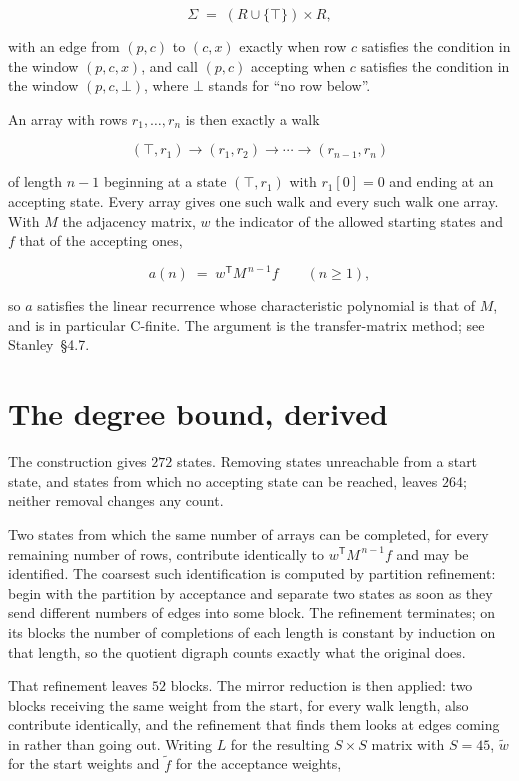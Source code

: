\documentclass[11pt]{article}
\theoremstyle{definition}
\begin{document}
\[\Sigma \;=\; (R \cup \{\top\}) \times R,\]

with an edge from $(p,c)$ to $(c,x)$ exactly when row $c$ satisfies the condition in the window $(p,c,x)$, and call $(p,c)$ accepting when $c$ satisfies the condition in the window $(p,c,\bot)$, where $\bot$ stands for ``no row below''.

An array with rows $r_1,\dots,r_n$ is then exactly a walk

\[(\top,r_1) \to (r_1,r_2) \to \cdots \to (r_{n-1},r_n)\]

of length $n-1$ beginning at a state $(\top,r_1)$ with $r_1[0]=0$ and ending at an accepting state. Every array gives one such walk and every such walk one array. With $M$ the adjacency matrix, $w$ the indicator of the allowed starting states and $f$ that of the accepting ones,

\[a(n) \;=\; w^{\mathsf T} M^{\,n-1} f \qquad (n \ge 1),\]

so $a$ satisfies the linear recurrence whose characteristic polynomial is that of $M$, and is in particular C-finite. The argument is the transfer-matrix method; see Stanley~\S4.7.

\section{The degree bound, derived}

The construction gives $272$ states. Removing states unreachable from a start state, and states from which no accepting state can be reached, leaves $264$; neither removal changes any count.

Two states from which the same number of arrays can be completed, for every remaining number of rows, contribute identically to $w^{\mathsf T}M^{\,n-1}f$ and may be identified. The coarsest such identification is computed by partition refinement: begin with the partition by acceptance and separate two states as soon as they send different numbers of edges into some block. The refinement terminates; on its blocks the number of completions of each length is constant by induction on that length, so the quotient digraph counts exactly what the original does.

That refinement leaves $52$ blocks. The mirror reduction is then applied: two blocks receiving the same weight from the start, for every walk length, also contribute identically, and the refinement that finds them looks at edges coming in rather than going out. Writing $L$ for the resulting $S \times S$ matrix with $S = 45$, $\tilde w$ for the start weights and $\tilde f$ for the acceptance weights,
\end{document}
